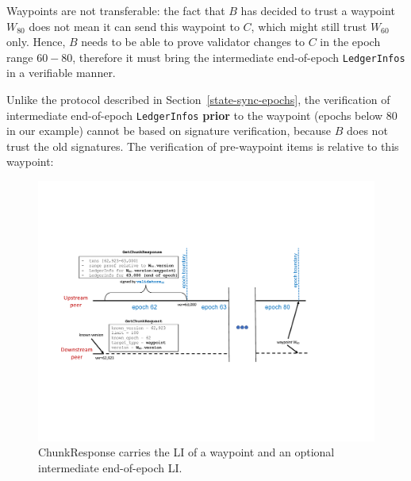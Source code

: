 \documentclass[letterpaper,10pt]{article}
\begin{document}
Waypoints are not transferable: the fact that $B$ has decided to trust a waypoint $W_{80}$ does not mean it can send this waypoint to $C$, which might still trust $W_{60}$ only. Hence, $B$ needs to be able to prove validator changes to $C$ in the epoch range $60-80$, therefore it must bring the intermediate end-of-epoch \texttt{LedgerInfos} in a verifiable manner.

Unlike the protocol described in Section~\ref{state-sync-epochs}, the verification of intermediate end-of-epoch \texttt{LedgerInfos} \textbf{prior} to the waypoint (epochs below $80$ in our example) cannot be based on signature verification, because $B$ does not trust the old signatures. The verification of pre-waypoint items is relative to this waypoint:

\begin{figure}[ht]
	\centering
	\includegraphics[width=\textwidth]{figures/state-sync-waypoint.pdf}
	\caption{\footnotesize{ChunkResponse carries the LI of a waypoint and an optional intermediate end-of-epoch LI.}}
	\label{fig:state-sync-waypoint}
\end{figure}
\end{document}

